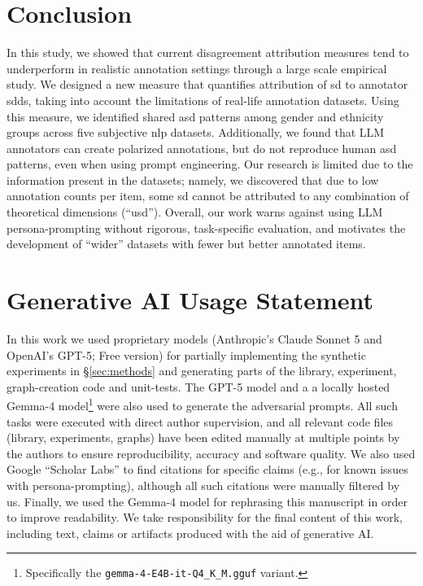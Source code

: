 \documentclass[manuscript,screen,review,anonymous]{acmart}
\theoremstyle{acmplain}
\theoremstyle{researchquestionstyle}
\begin{document}
\section*{Conclusion}
In this study, we showed that current disagreement attribution measures tend to underperform in realistic annotation settings through a large scale empirical study. We designed a new measure that quantifies attribution of \ac{sd} to annotator \acp{sdd}, taking into account the limitations of real-life annotation datasets. Using this measure, we identified shared \ac{asd} patterns among gender and ethnicity groups across five subjective \ac{nlp} datasets. Additionally, we found that LLM annotators can create polarized annotations, but do not reproduce human \ac{asd} patterns, even when using prompt engineering. Our research is limited due to the information present in the datasets; namely, we discovered that due to low annotation counts per item, some \ac{sd} cannot be attributed to any combination of theoretical dimensions (``\ac{usd}''). Overall, our work warns against using LLM persona-prompting without rigorous, task-specific evaluation, and motivates the development of ``wider'' datasets with fewer but better annotated items.


\section*{Generative AI Usage Statement}
\label{sec:genai}
In this work we used proprietary models (Anthropic's Claude Sonnet 5 and OpenAI's GPT-5; Free version) for partially implementing the synthetic experiments in \S\ref{sec:methods} and generating parts of the library, experiment, graph-creation code and unit-tests. The GPT-5 model and a  a locally hosted Gemma-4 model\footnote{Specifically the \texttt{gemma-4-E4B-it-Q4\_K\_M.gguf} variant.} were also used to generate the adversarial prompts. All such tasks were executed with direct author supervision, and all relevant code files (library, experiments, graphs) have been edited manually at multiple points by the authors to ensure reproducibility, accuracy and software quality. We also used Google ``Scholar Labs'' to find citations for specific claims (e.g., for known issues with persona-prompting), although all such citations were manually filtered by us. Finally, we used the Gemma-4 model for rephrasing this manuscript in order to improve readability. We take responsibility for the final content of this work, including text, claims or artifacts produced with the aid of generative AI.
\end{document}

